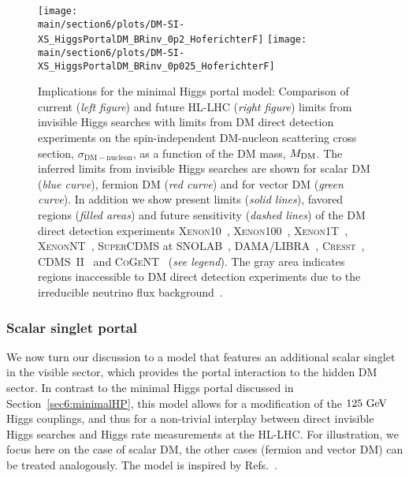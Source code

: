 \documentclass[../report.tex]{subfiles}
\providecommand{\main}{..}
\begin{document}
\begin{figure}
\centering
\texttt{[image: \\main/section6/plots/DM-SI-XS\_HiggsPortalDM\_BRinv\_0p2\_HoferichterF]}
\hfill
\texttt{[image: \\main/section6/plots/DM-SI-XS\_HiggsPortalDM\_BRinv\_0p025\_HoferichterF]}
\caption{\label{fig:mini} Implications for the minimal Higgs portal model: Comparison of current (\emph{left figure}) and future HL-LHC (\emph{right figure}) limits from invisible Higgs searches  with limits from DM direct detection experiments on the spin-independent DM-nucleon scattering cross section, $\sigma_{\mathrm{DM}-\mathrm{nucleon}}$, as a function of the DM mass, $M_\mathrm{DM}$. The inferred limits from invisible Higgs searches are shown for scalar DM (\emph{blue curve}), fermion DM (\emph{red  curve}) and for vector DM (\emph{green  curve}). In addition we show present limits (\emph{solid lines}), favored regions (\emph{filled areas}) and future sensitivity (\emph{dashed lines}) of the DM direct detection experiments \textsc{Xenon10}~\cite{Angle:2011th}, \textsc{Xenon100}~\cite{Aprile:2012nq}, \textsc{Xenon1T}~\cite{Aprile:2018dbl}, \textsc{XenonNT}~\cite{Aprile:2015uzo}, \textsc{SuperCDMS} at SNOLAB~\cite{Agnese:2016cpb}, \textsc{DAMA/LIBRA}~\cite{Savage:2008er}, \textsc{Cresst}~\cite{Angloher:2011uu}, \textsc{CDMS~II}~\cite{Agnese:2013rvf} and \textsc{CoGeNT}~\cite{Aalseth:2012if} (\emph{see legend}). The gray area indicates regions inaccessible to DM direct detection experiments due to the irreducible neutrino flux background~\cite{Billard:2013qya}.}
\label{fig:minimalHP}
\end{figure}



\subsubsection{Scalar singlet portal}
\label{sec6:singletHP}
We now turn our discussion to a model that features an additional scalar singlet in the visible sector, which provides the portal interaction to the hidden DM sector. In contrast to the minimal Higgs portal discussed in Section~\ref{sec6:minimalHP}, this model allows for a modification of the $125~\text{GeV}$ Higgs couplings, and thus for a non-trivial interplay between direct invisible Higgs searches and Higgs rate measurements at the HL-LHC. For illustration, we focus here on the case of scalar DM, the other cases (fermion and vector DM) can be treated analogously. The model is inspired by Refs.~\cite{Englert:2011yb,Robens:2015gla}.
\end{document}
